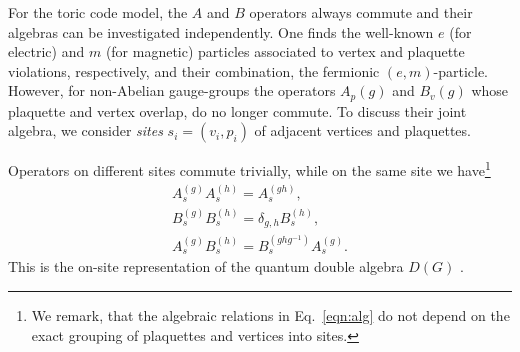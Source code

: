\documentclass[two column]{article}
\newcommand{\jovan}[1]{\textcolor{blue}{[#1]}}
\begin{document}
For the toric code model, the $A$ and $B$ operators always commute and their algebras can be investigated independently. One finds the well-known $e$ (for electric) and $m$ (for magnetic) particles associated to vertex and plaquette violations, respectively, and their combination, the fermionic $(e,m)$-particle. However, for non-Abelian gauge-groups the operators $A_p(g)$ and $B_v(g)$ whose plaquette and vertex overlap, do no longer commute. To discuss their joint algebra, we consider \emph{sites}
 $s_i = (v_i, p_i)$ of adjacent vertices and plaquettes.
%
%

%
 
Operators on different sites commute trivially, while on the same site we have\footnote{We remark, that the algebraic relations in Eq.~\eqref{eqn:alg} do not depend on the exact grouping of plaquettes and vertices into sites.} 
\begin{equation}
    \begin{split}
        A_s^{(g)}A_s^{(h)} = A_s^{(gh)}, \\
        B_s^{(g)}B_s^{(h)} = \delta_{g,h} B_s^{(h)},\\
        A_s^{(g)}B_s^{(h)} = B_s^{(ghg^{-1})}A_s^{(g)}.
    \end{split}\label{eqn:alg}
\end{equation}
This is the on-site representation of the quantum double algebra $D(G)$ 
\cite{cui2018topological, Kitaev_2003}. 
\end{document}
